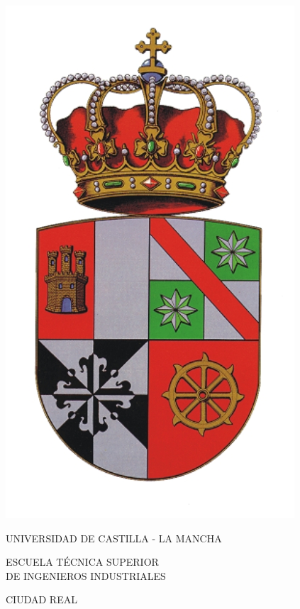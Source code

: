 \documentclass[twoside,openright,12pt]{report}
\begin{document}
\pagestyle{empty}
\begin{titlepage}

\begin{center}
\includegraphics{./figs/uclm} %
\bigskip
\medskip

\fontsize{17pt}{19pt}
{\selectfont  UNIVERSIDAD DE CASTILLA - LA MANCHA} \\ 
\bigskip
\smallskip

{\selectfont ESCUELA TÉCNICA SUPERIOR \\ \medskip
DE INGENIEROS INDUSTRIALES}


\bigskip
\medskip
{}\fontsize{15pt}{17pt}
{\selectfont CIUDAD REAL}

\vspace*{2cm} 


\end{center}
\end{titlepage}
\end{document}

